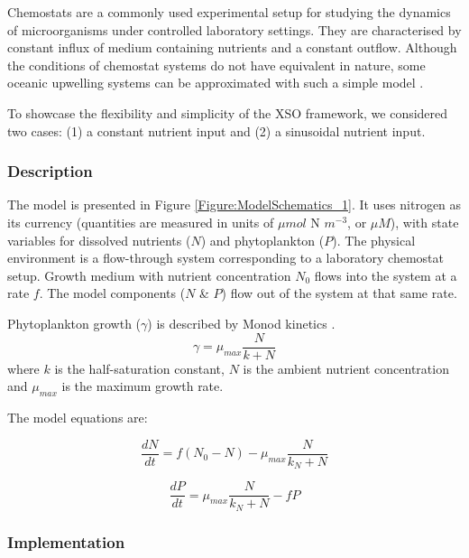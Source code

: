 \documentclass[journal abbreviation, manuscript]{copernicus}
\begin{document}
Chemostats are a commonly used experimental setup for studying the dynamics of microorganisms under controlled laboratory settings. They are characterised by constant influx of medium containing nutrients and a constant outflow. Although the conditions of chemostat systems do not have equivalent in nature, some oceanic upwelling systems can be approximated with such a simple model \citep{Haefner2005ModelingApplications}.

To showcase the flexibility and simplicity of the XSO framework, we considered two cases: (1) a constant nutrient input and (2) a sinusoidal nutrient input.

\subsubsection{Description}
The model is presented in Figure \ref{Figure:ModelSchematics_1}. It uses nitrogen as its currency (quantities are measured in units of $\mu mol$ N $m^{-3}$, or $\mu M$), with state variables for dissolved nutrients ($N$) and phytoplankton ($P$). The physical environment is a flow-through system corresponding to a laboratory chemostat setup. Growth medium with nutrient concentration $N_0$ flows into the system at a rate $f$. The model components ($N$ \& $P$) flow out of the system at that same rate.

Phytoplankton growth ($\gamma$) is described by Monod kinetics \citep{Monod1942RecherchesBacteriennes}.
\begin{equation}
    \gamma = \mu_{max} \frac{N}{k + N} 
\end{equation}
where $k$ is the half-saturation constant, $N$ is the ambient nutrient concentration and $\mu_{max}$ is the maximum growth rate.

The model equations are:

\begin{equation}
    \frac{d N}{d t} = 
    f (N_0 - N) %
    -  \mu_{max} \frac{N}{k_N + N} 
\end{equation}

\begin{equation}
    \frac{d P}{d t} =
    \mu_{max} \frac{N}{k_N + N} 
    - f P
\end{equation}



\subsubsection{Implementation}
\end{document}

